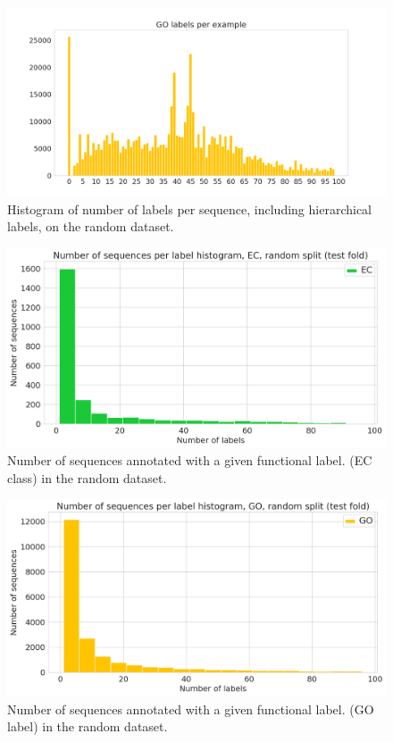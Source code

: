 \begin{figure}[htbp]
\centering
  \includegraphics[width=\textwidth]{Figures/go_label_distribution.png}
  \caption{Histogram of number of labels per sequence, including hierarchical labels, on the random dataset.}
\end{figure}
\begin{figure}[htbp]
\centering
  \includegraphics[width=\textwidth]{Figures/sequences_per_label_ec_random.png}
  \caption{Number of sequences annotated with a given functional label. (EC class) in the random dataset.}
\end{figure}
\begin{figure}[htbp]
\centering
  \includegraphics[width=\textwidth]{Figures/sequences_per_label_go_random.png}
  \caption{Number of sequences annotated with a given functional label. (GO label) in the random dataset.}
\end{figure}
